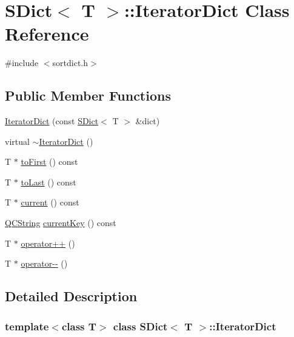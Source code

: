 \hypertarget{class_s_dict_1_1_iterator_dict}{}\section{S\+Dict$<$ T $>$\+::Iterator\+Dict Class Reference}
\label{class_s_dict_1_1_iterator_dict}


{\ttfamily \#include $<$sortdict.\+h$>$}

\subsection*{Public Member Functions}
\begin{DoxyCompactItemize}
\item 
\mbox{\hyperlink{class_s_dict_1_1_iterator_dict_a23920bdd95642c98bf29aaafbb55f949}{Iterator\+Dict}} (const \mbox{\hyperlink{class_s_dict}{S\+Dict}}$<$ T $>$ \&dict)
\item 
virtual \mbox{\hyperlink{class_s_dict_1_1_iterator_dict_a38499552aca040055682862929ab4477}{$\sim$\+Iterator\+Dict}} ()
\item 
T $\ast$ \mbox{\hyperlink{class_s_dict_1_1_iterator_dict_abb90d1056963746a20c592b8c998846c}{to\+First}} () const
\item 
T $\ast$ \mbox{\hyperlink{class_s_dict_1_1_iterator_dict_aae597075deb2c8fd6032b1145f9cefb0}{to\+Last}} () const
\item 
T $\ast$ \mbox{\hyperlink{class_s_dict_1_1_iterator_dict_aae1d566fc16e61bd4778cbe4350255fb}{current}} () const
\item 
\mbox{\hyperlink{class_q_c_string}{Q\+C\+String}} \mbox{\hyperlink{class_s_dict_1_1_iterator_dict_a9e9b359e0e0434744d0ba8e9da4e4f48}{current\+Key}} () const
\item 
T $\ast$ \mbox{\hyperlink{class_s_dict_1_1_iterator_dict_ae2fbd7c81e8c8f04d6df63c112c0514e}{operator++}} ()
\item 
T $\ast$ \mbox{\hyperlink{class_s_dict_1_1_iterator_dict_a842928fda118cdd32174fa614e4adfc7}{operator-\/-\/}} ()
\end{DoxyCompactItemize}


\subsection{Detailed Description}
\subsubsection*{template$<$class T$>$\newline
class S\+Dict$<$ T $>$\+::\+Iterator\+Dict}

